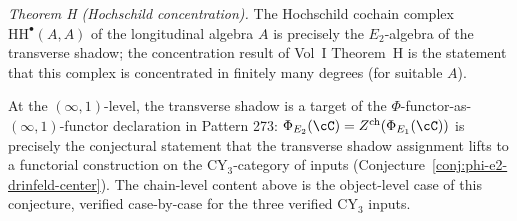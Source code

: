 \emph{Theorem H (Hochschild concentration).}  The Hochschild cochain
complex $\mathrm{HH}^\bullet(A, A)$ of the longitudinal algebra $A$
is precisely the $E_2$-algebra of the transverse shadow; the
concentration result of Vol~I Theorem~H is the statement that this
complex is concentrated in finitely many degrees (for suitable $A$).

At the $(\infty, 1)$-level, the transverse shadow is a target of the
$\Phi$-functor-as-$(\infty, 1)$-functor declaration in Pattern 273:
$\Phi_{E_2}(\cC) = Z^{\mathrm{ch}}(\Phi_{E_1}(\cC))$ is precisely the
conjectural statement that the transverse shadow assignment lifts to
a functorial construction on the CY$_3$-category of inputs
(Conjecture~\ref{conj:phi-e2-drinfeld-center}).  The chain-level
content above is the object-level case of this conjecture, verified
case-by-case for the three verified CY$_3$ inputs.
